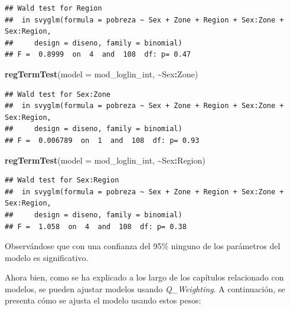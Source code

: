 \documentclass[
  spanish,
  12pt,
]{book}
\newenvironment{Shaded}{\begin{snugshade}}{\end{snugshade}}
\newcommand{\AttributeTok}[1]{\textcolor[rgb]{0.13,0.29,0.53}{#1}}
\newcommand{\FunctionTok}[1]{\textcolor[rgb]{0.13,0.29,0.53}{\textbf{#1}}}
\newcommand{\NormalTok}[1]{#1}
\newcommand{\SpecialCharTok}[1]{\textcolor[rgb]{0.81,0.36,0.00}{\textbf{#1}}}
\begin{document}
\begin{verbatim}
## Wald test for Region
##  in svyglm(formula = pobreza ~ Sex + Zone + Region + Sex:Zone + Sex:Region, 
##     design = diseno, family = binomial)
## F =  0.8999  on  4  and  108  df: p= 0.47
\end{verbatim}

\begin{Shaded}
\begin{Highlighting}[]
  \FunctionTok{regTermTest}\NormalTok{(}\AttributeTok{model =}\NormalTok{ mod\_loglin\_int, }\SpecialCharTok{\textasciitilde{}}\NormalTok{Sex}\SpecialCharTok{:}\NormalTok{Zone)}
\end{Highlighting}
\end{Shaded}

\begin{verbatim}
## Wald test for Sex:Zone
##  in svyglm(formula = pobreza ~ Sex + Zone + Region + Sex:Zone + Sex:Region, 
##     design = diseno, family = binomial)
## F =  0.006789  on  1  and  108  df: p= 0.93
\end{verbatim}

\begin{Shaded}
\begin{Highlighting}[]
  \FunctionTok{regTermTest}\NormalTok{(}\AttributeTok{model =}\NormalTok{ mod\_loglin\_int, }\SpecialCharTok{\textasciitilde{}}\NormalTok{Sex}\SpecialCharTok{:}\NormalTok{Region)}
\end{Highlighting}
\end{Shaded}

\begin{verbatim}
## Wald test for Sex:Region
##  in svyglm(formula = pobreza ~ Sex + Zone + Region + Sex:Zone + Sex:Region, 
##     design = diseno, family = binomial)
## F =  1.058  on  4  and  108  df: p= 0.38
\end{verbatim}

Observándose que con una confianza del 95\% ninguno de los parámetros del modelo es significativo.

Ahora bien, como se ha explicado a los largo de los capítulos relacionado con modelos, se pueden ajustar modelos usando \emph{Q\_Weighting}. A continuación, se presenta cómo se ajusta el modelo usando estos pesos:
\end{document}
